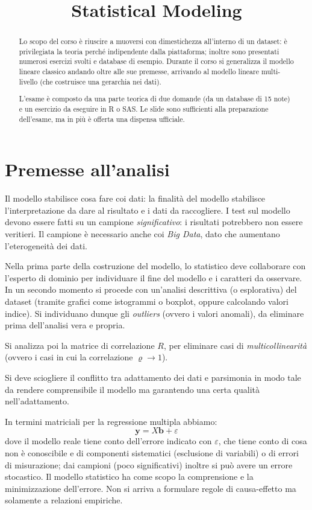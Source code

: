 \documentclass[11pt, twocolumn]{article}
\title{\textbf{Statistical Modeling}}
\author{}
\date{}
\begin{document}
\maketitle
\begin{abstract}
  Lo scopo del corso è riuscire a muoversi con dimestichezza all'interno di un dataset: è privilegiata la teoria perché indipendente dalla piattaforma; inoltre sono presentati numerosi esercizi svolti e database di esempio.
  Durante il corso si generalizza il modello lineare classico andando oltre alle sue premesse, arrivando al modello lineare multi-livello (che costruisce una gerarchia nei dati).

  L'esame è composto da una parte teorica di due domande (da un database di 15 note) e un esercizio da eseguire in R o SAS.
  Le slide sono sufficienti alla preparazione dell'esame, ma in più è offerta una dispensa ufficiale.
\end{abstract}

\newpage
\part{Premesse all'analisi}
Il modello stabilisce cosa fare coi dati: la finalità del modello stabilisce l'interpretazione da dare al risultato e i dati da raccogliere.
I test sul modello devono essere fatti su un campione \textit{significativo}: i risultati potrebbero non essere veritieri.
Il campione è necessario anche coi \textit{Big Data}, dato che aumentano l'eterogeneità dei dati.

Nella prima parte della costruzione del modello, lo statistico deve collaborare con l'esperto di dominio per individuare il fine del modello e i caratteri da osservare.
In un secondo momento si procede con un'analisi descrittiva (o esplorativa) del dataset (tramite grafici come istogrammi o boxplot, oppure calcolando valori indice).
Si individuano dunque gli \textit{outliers} (ovvero i valori anomali), da eliminare prima dell'analisi vera e propria.


Si analizza poi la matrice di correlazione $R$, per eliminare casi di \textit{multicollinearità} (ovvero i casi in cui la correlazione $\varrho \to 1$).

Si deve sciogliere il conflitto tra adattamento dei dati e parsimonia in modo tale da rendere comprensibile il modello ma garantendo una certa qualità nell'adattamento.

In termini matriciali per la regressione multipla abbiamo:
$$\textbf{y} = X \textbf{b} + \varepsilon$$
dove il modello reale tiene conto dell'errore indicato con $\varepsilon$, che tiene conto di cosa non è conoscibile e di componenti sistematici (esclusione di variabili) o di errori di misurazione; dai campioni (poco significativi) inoltre si può avere un errore stocastico.
Il modello statistico ha come scopo la comprensione e la minimizzazione dell'errore.
Non si arriva a formulare regole di causa-effetto ma solamente a relazioni empiriche.
\end{document}
